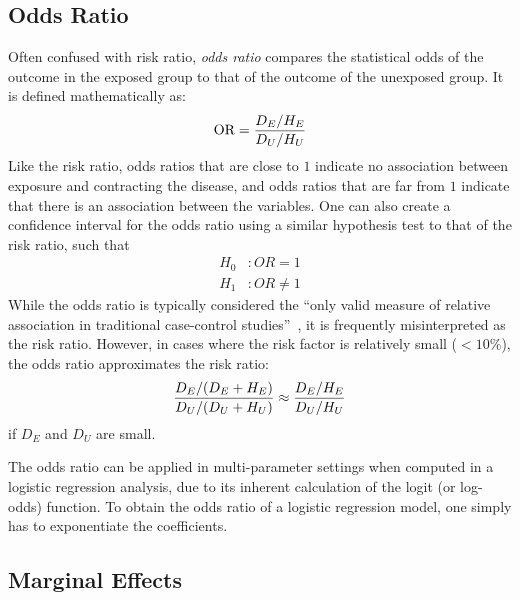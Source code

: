\subsection{Odds Ratio}
\label{subsec:odds-ratio}
Often confused with risk ratio, \emph{odds ratio} compares the statistical odds of the outcome in the exposed group to that of the outcome of the unexposed group.
It is defined mathematically as:
\begin{align*}
 \text{OR} = \frac{D_{E} / H_{E}}{D_{U} / H_{U}}
\end{align*}
Like the risk ratio, odds ratios that are close to $1$ indicate no association between exposure and contracting the disease, and odds ratios that are far from $1$ indicate that there is an association between the variables.
One can also create a confidence interval for the odds ratio using a similar hypothesis test to that of the risk ratio, such that
\begin{align*}
    H_0&: OR = 1 \\
    H_1&: OR \neq 1
\end{align*}
While the odds ratio is typically considered the \enquote{only valid measure of relative association in traditional case-control studies}~\citep{Relative-Measures-of-Association-for-Binary-Outcomes}, it is frequently misinterpreted as the risk ratio.
However, in cases where the risk factor is relatively small ($< 10\%$), the odds ratio approximates the risk ratio:
\begin{align*}
    \frac{D_{E} / (D_{E} + H_{E})}{D_{U} / (D_{U} + H_{U})} \approx \frac{D_{E} / H_{E}}{D_{U} / H_{U}}
\end{align*}
if $D_E$ and $D_U$ are small.

The odds ratio can be applied in multi-parameter settings when computed in a logistic regression analysis, due to its inherent calculation of the logit (or log-odds) function.
To obtain the odds ratio of a logistic regression model, one simply has to exponentiate the coefficients.


\subsection{Marginal Effects}\label{subsec:marginal-effects}

